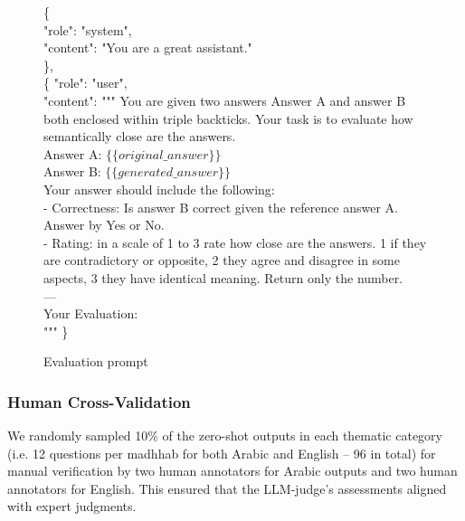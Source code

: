 \documentclass[letterpaper]{article}
\begin{document}
\begin{figure}
    \centering
    \small
     \begin{tcolorbox}[colback=black!10, boxrule=0pt]
     {
    \{ \\
        "role": "system", \\
        "content": "You are a great assistant." \\
    \},\\
    \{ 
        "role": "user",\\
        "content": """ You are given two answers Answer A and answer B both enclosed within triple backticks. Your task is to evaluate how semantically close are the answers. \\
        Answer A:  $\{\{original\_answer\}\}$ \\
        Answer B: $ \{\{generated\_answer \}\} $ \\
Your answer should include the following: \\
- Correctness: Is answer B correct given the reference answer A. Answer by Yes or No. \\
- Rating: in a scale of 1 to 3 rate how close are the answers. 1 if they are contradictory or opposite, 2 they agree and disagree in some aspects, 3 they have identical meaning. Return only the number.\\
--- \\
Your Evaluation: \\
"""
    \}
}
    \end{tcolorbox} 
    \caption{Evaluation prompt}
    \label{eval_prompt}
\end{figure}

\subsubsection{Human Cross-Validation} We randomly sampled 10\% of the zero-shot outputs in each thematic category (i.e. 12 questions per madhhab for both Arabic and English -- 96 in total) for manual verification by two human annotators for Arabic outputs and two human annotators for English. This ensured that the LLM-judge’s assessments aligned with expert judgments.
\end{document}

